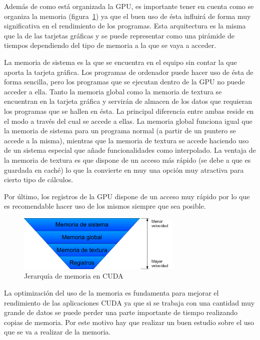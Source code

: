 Además de como está organizada la GPU, es importante tener en cuenta como se organiza la memoria (figura~\ref{fig:memcuda}) ya que el buen uso de ésta influirá de forma muy significativa en el rendimiento de los programas. Esta arquitectura es la misma que la de las tarjetas gráficas y se puede representar como una pirámide de tiempos dependiendo del tipo de memoria a la que se vaya a acceder.

La memoria de sistema es la que se encuentra en el equipo sin contar la que aporta la tarjeta gráfica. Los programas de ordenador puede hacer uso de ésta de forma sencilla, pero los programas que se ejecutan dentro de la GPU no puede acceder a ella. Tanto la memoria global como la memoria de textura se encuentran en la tarjeta gráfica y servirán de almacen de los datos que requieran los programas que se hallen en ésta. La principal diferencia entre ambas reside en el modo a través del cual se accede a ellas. La memoria global funciona igual que la memoria de sistema para un programa normal (a partir de un puntero se accede a la misma), mientras que la memoria de textura se accede haciendo uso de un sistema especial que añade funcionalidades como interpolado. La ventaja de la memoria de textura es que dispone de un acceso más rápido (se debe a que es guardada en caché) lo que la convierte en muy una opción muy atractiva para cierto tipo de cálculos.

Por último, los registros de la GPU dispone de un acceso muy rápido por lo que es recomendable hacer uso de los mismos siempre que sea posible.

\begin{figure}
	\centering
	\includegraphics[width=0.7\textwidth]{images/MemoriaCuda.pdf}
	\caption{Jerarquía de memoria en CUDA}\label{fig:memcuda}
\end{figure}

La optimización del uso de la memoria es fundamenta para mejorar el rendimiento de las aplicaciones CUDA ya que si se trabaja con una cantidad muy grande de datos se puede perder una parte importante de tiempo realizando copias de memoria. Por este motivo hay que realizar un buen estudio sobre el uso que se va a realizar de la memoria.

